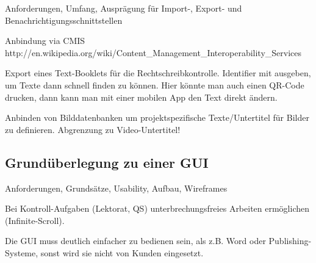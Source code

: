 Anforderungen, Umfang, Ausprägung für Import-, Export- und Benachrichtigungsschnittstellen

Anbindung via CMIS http://en.wikipedia.org/wiki/Content\_Management\_Interoperability\_Services

Export eines Text-Booklets für die Rechtschreibkontrolle. Identifier mit ausgeben, um Texte dann schnell finden zu können. Hier könnte man auch einen QR-Code drucken, dann kann man mit einer mobilen App den Text direkt ändern.

Anbinden von Bilddatenbanken um projektspezifische Texte/Untertitel für Bilder zu definieren. Abgrenzung zu Video-Untertitel!

\subsection{Grundüberlegung zu einer GUI}

Anforderungen, Grundsätze, Usability, Aufbau, Wireframes

Bei Kontroll-Aufgaben (Lektorat, QS) unterbrechungsfreies Arbeiten ermöglichen (Infinite-Scroll).

Die GUI muss deutlich einfacher zu bedienen sein, als z.B. Word oder Publishing-Systeme, sonst wird sie nicht von Kunden eingesetzt.